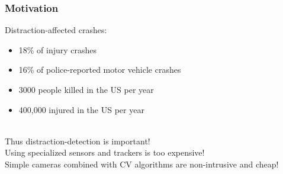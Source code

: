 \documentclass{beamer}
\begin{document}
	\begin{frame}
		\frametitle{Motivation}
		Distraction-affected crashes:
		\begin{itemize}
			\item 18\% of injury crashes \cite{knuthwebsite}
			\item 16\% of police-reported motor vehicle crashes
			\item 3000 people killed in the US per year
			\item 400,000 injured in the US per year
		\end{itemize}\\
		\vspace{0.2cm}
		Thus distraction-detection is important! \\
		\vspace{0.2cm}
		Using specialized sensors and trackers is too expensive! \\
		\vspace{0.2cm}
		Simple cameras combined with CV algorithms are non-intrusive and cheap!
	\end{frame}
	
\end{document}
